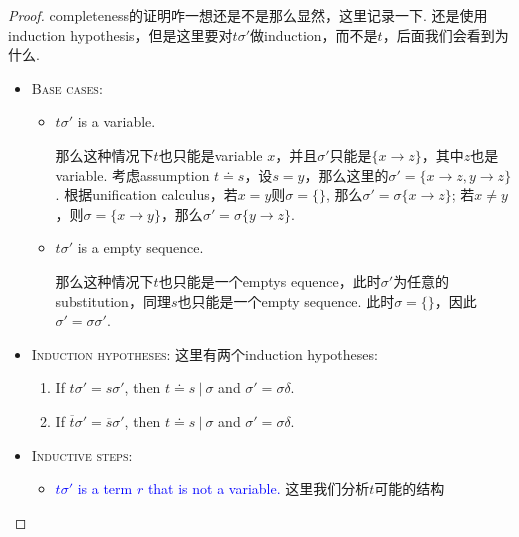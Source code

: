 \documentclass{article}
\theoremstyle{plain}
\newcounter{case}
\newcounter{subcase}[case]
\theoremstyle{nonumberplain}
\newtheorem{proof}{Proof}
\newcommand{\bluet}[1]{\textcolor{blue}{#1}}
\begin{document}
\begin{proof}
completeness的证明咋一想还是不是那么显然，这里记录一下. 还是使用induction hypothesis，但是这里要对$t\sigma'$做induction，而不是$t$，后面我们会看到为什么.
\begin{itemize}
	\item \textsc{Base cases}:
	\begin{itemize}
		\item $t\sigma'$ is a variable.
		
		那么这种情况下$t$也只能是variable $x$，并且$\sigma'$只能是$\{x \to z\}$，其中$z$也是variable. 考虑assumption $t \doteq s$，设$s = y$，那么这里的$\sigma' = \{x \to z, y \to z\}$. 根据unification calculus，若$x = y$则$\sigma = \{\}$, 那么$\sigma' = \sigma\{x \to z\}$; 若$x \neq y$，则$\sigma = \{x \to y\}$，那么$\sigma' = \sigma\{y \to z\}$.
		
		\item $t\sigma'$ is a empty sequence.
		
		那么这种情况下$t$也只能是一个emptys equence，此时$\sigma'$为任意的substitution，同理$s$也只能是一个empty sequence. 此时$\sigma = \{\}$，因此$\sigma' = \sigma\sigma'$. 
	\end{itemize}
	
	\item \textsc{Induction hypotheses}:
	这里有两个induction hypotheses:
	\begin{enumerate}
		\item If $t\sigma' = s\sigma'$, then $t \doteq s ~|~\sigma$ and $\sigma' = \sigma\delta$.
		\item If $\overline{t}\sigma' = \overline{s}\sigma'$, then $t \doteq s ~|~\sigma$ and $\sigma' = \sigma\delta$.
	\end{enumerate}
	
	\item \textsc{Inductive steps}: 
	\begin{itemize}
		\item \bluet{$t\sigma'$ is a term $r$ that is not a variable.} 
		这里我们分析$t$可能的结构
\end{itemize}
\end{itemize}
\end{proof}
\end{document}
